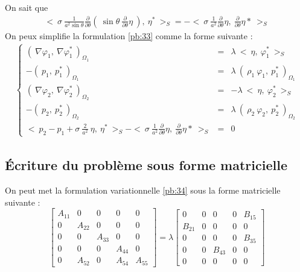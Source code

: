 \documentclass[a4paper]{report}
\begin{document}
On sait que
\begin{eqnarray*}
<\ \sigma\ \frac{1}{a^2 \sin\theta} \frac{\partial}{\partial \theta}(\ \sin\theta \ \frac{\partial}{\partial \theta} \eta \ ) ,\ \eta^* \ >_S
=
- <\ \sigma\ \frac{1}{a^2} \frac{\partial}{\partial \theta} \eta ,\ \frac{\partial}{\partial \theta} \eta* \ >_S
\end{eqnarray*}
On peux simplifie la formulation \eqref{pb:33} comme la forme suivante :
\begin{eqnarray}\label{pb:34}
\left\{
\begin{array}{rcl}
(\ \nabla \varphi_1 ,\ \nabla \varphi^*_1 \ )_{\Omega_1} &=& \lambda\ <\ \eta,\ \varphi^*_1 \ >_S \\
- (\ p_1 ,\ p^*_1 \ )_{\Omega_1} &=& \lambda\ (\ \rho_1\ \varphi_1 ,\ p^*_1 \ )_{\Omega_1} \\
(\ \nabla \varphi_2 ,\ \nabla \varphi^*_2 \ )_{\Omega_2} &=& - \lambda\ <\ \eta,\ \varphi^*_2 \ >_S \\
- (\ p_2 ,\ p^*_2 \ )_{\Omega_2} &=& \lambda\ (\ \rho_2\ \varphi_2 ,\ p^*_2 \ )_{\Omega_2} \\
<\ p_2 - p_1 + \sigma\ \frac{2}{a^2} \ \eta ,\ \eta^* \ >_S - <\ \sigma\ \frac{1}{a^2} \frac{\partial}{\partial \theta} \eta ,\ \frac{\partial}{\partial \theta} \eta* \ >_S &=& 0
\end{array}
\right.
\end{eqnarray}
\subsection{Écriture du problème sous forme matricielle}
On peut met la formulation variationnelle \eqref{pb:34} sous la forme matricielle suivante :
\begin{equation}\label{eq:35}
\begin{bmatrix}
A_{11} & 0      & 0      & 0      & 0\\
0      & A_{22} & 0      & 0      & 0\\
0      & 0      & A_{33} & 0      & 0\\
0      & 0      & 0      & A_{44} & 0\\
0      & A_{52} & 0      & A_{54} & A_{55}
\end{bmatrix}
=
\lambda
\begin{bmatrix}
0      & 0 & 0      & 0 & B_{15}\\
B_{21} & 0 & 0      & 0 & 0\\
0      & 0 & 0      & 0 & B_{35}\\
0      & 0 & B_{43} & 0 & 0\\
0      & 0 & 0      & 0 & 0
\end{bmatrix}
\end{equation}
\newpage
\end{document}
